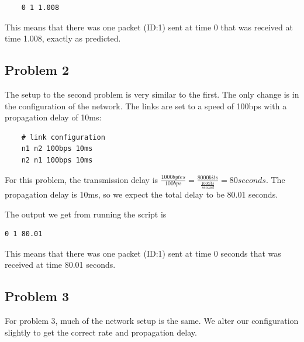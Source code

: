 \documentclass[11pt]{article}
\begin{document}
\begin{lstlisting}
    0 1 1.008
\end{lstlisting}

\vspace{5mm}

This means that there was one packet (ID:1) sent at time 0 that was received at time 1.008, exactly as predicted.

\subsection{Problem 2}

The setup to the second problem is very similar to the first. The only change is in the configuration of the network. The links are set to a speed of 100bps with a propagation delay of 10ms:

\vspace{5mm}

\begin{lstlisting}
    # link configuration
    n1 n2 100bps 10ms
    n2 n1 100bps 10ms
\end{lstlisting}

\vspace{5mm}

For this problem, the transmission delay is \(\frac{1000bytes}{100bps} = \frac{8000bits}{\frac{100bits}{second}} = 80 seconds\). The propagation delay is 10ms, so we expect the total delay to be 80.01 seconds. \par

The output we get from running the script is

\vspace{5mm}

\begin{lstlisting}
0 1 80.01
\end{lstlisting}

\vspace{5mm}

This means that there was one packet (ID:1) sent at time 0 seconds that was received at time 80.01 seconds.

\subsection{Problem 3}

For problem 3, much of the network setup is the same. We alter our configuration slightly to get the correct rate and propagation delay.

\vspace{5mm}
\end{document}
